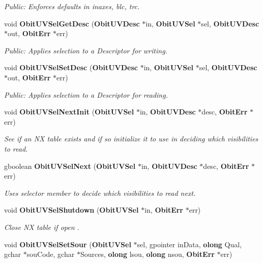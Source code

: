 \begin{CompactItemize}
\begin{CompactList}\small\item\em Public: Enforces defaults in inaxes, blc, trc. \item\end{CompactList}\item 
void {\bf Obit\-UVSel\-Get\-Desc} ({\bf Obit\-UVDesc} $\ast$in, {\bf Obit\-UVSel} $\ast$sel, {\bf Obit\-UVDesc} $\ast$out, {\bf Obit\-Err} $\ast$err)
\begin{CompactList}\small\item\em Public: Applies selection to a Descriptor for writing. \item\end{CompactList}\item 
void {\bf Obit\-UVSel\-Set\-Desc} ({\bf Obit\-UVDesc} $\ast$in, {\bf Obit\-UVSel} $\ast$sel, {\bf Obit\-UVDesc} $\ast$out, {\bf Obit\-Err} $\ast$err)
\begin{CompactList}\small\item\em Public: Applies selection to a Descriptor for reading. \item\end{CompactList}\item 
void {\bf Obit\-UVSel\-Next\-Init} ({\bf Obit\-UVSel} $\ast$in, {\bf Obit\-UVDesc} $\ast$desc, {\bf Obit\-Err} $\ast$err)
\begin{CompactList}\small\item\em See if an NX table exists and if so initialize it to use in deciding which visibilities to read. \item\end{CompactList}\item 
gboolean {\bf Obit\-UVSel\-Next} ({\bf Obit\-UVSel} $\ast$in, {\bf Obit\-UVDesc} $\ast$desc, {\bf Obit\-Err} $\ast$err)
\begin{CompactList}\small\item\em Uses selector member to decide which visibilities to read next. \item\end{CompactList}\item 
void {\bf Obit\-UVSel\-Shutdown} ({\bf Obit\-UVSel} $\ast$in, {\bf Obit\-Err} $\ast$err)
\begin{CompactList}\small\item\em Close NX table if open . \item\end{CompactList}\item 
void {\bf Obit\-UVSel\-Set\-Sour} ({\bf Obit\-UVSel} $\ast$sel, gpointer in\-Data, {\bf olong} Qual, gchar $\ast$sou\-Code, gchar $\ast$Sources, {\bf olong} lsou, {\bf olong} nsou, {\bf Obit\-Err} $\ast$err)

\end{CompactItemize}
